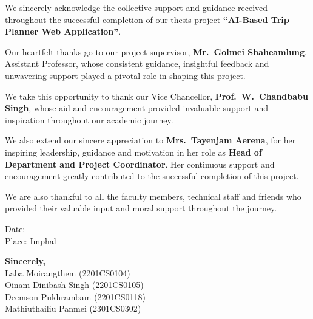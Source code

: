 {
\fontsize{12}{14}\selectfont
\noindent
We sincerely acknowledge the collective support and guidance received throughout the successful completion of our thesis project \textbf{``AI-Based Trip Planner Web Application''}.

\vspace{0.4cm}
\noindent
Our heartfelt thanks go to our project supervisor, \textbf{Mr.\ Golmei Shaheamlung}, Assistant Professor, whose consistent guidance, insightful feedback and unwavering support played a pivotal role in shaping this project.

\vspace{0.4cm}
\noindent
We take this opportunity to thank our Vice Chancellor, \textbf{Prof.\ W.\ Chandbabu Singh}, whose aid and encouragement provided invaluable support and inspiration throughout our academic journey.

\vspace{0.4cm}
\noindent
We also extend our sincere appreciation to \textbf{Mrs.\ Tayenjam Aerena}, for her inspiring leadership, guidance and motivation in her role as \textbf{Head of Department and Project Coordinator}. Her continuous support and encouragement greatly contributed to the successful completion of this project.

\vspace{0.4cm}
\noindent
We are also thankful to all the faculty members, technical staff and friends who provided their valuable input and moral support throughout the journey.

\vspace{1.5cm}
\noindent
\begin{minipage}[t]{0.4\textwidth}
    \begin{flushleft}
        Date: \\
        Place: Imphal
    \end{flushleft}
\end{minipage}%
\hfill
\begin{minipage}[t]{0.58\textwidth}
    \begin{flushright}
        \textbf{Sincerely,}\\[0.5em]
        Laba Moirangthem (2201CS0104)\\
        Oinam Dinibash Singh (2201CS0105)\\
        Deemson Pukhrambam (2201CS0118)\\
        Mathiuthailiu Panmei (2301CS0302)
    \end{flushright}
\end{minipage}
}
